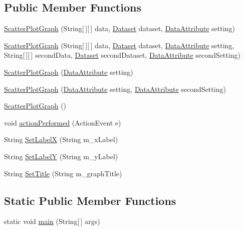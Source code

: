 \subsection*{Public Member Functions}
\begin{DoxyCompactItemize}
\item 
\hyperlink{class_scatter_plot_graph_ac2fd61853bd154841052c26cb3ffb4be}{Scatter\-Plot\-Graph} (String\mbox{[}$\,$\mbox{]}\mbox{[}$\,$\mbox{]} data, \hyperlink{class_dataset}{Dataset} dataset, \hyperlink{class_data_attribute}{Data\-Attribute} setting)
\item 
\hyperlink{class_scatter_plot_graph_a7ef427d6eaea9bd50ac1e3b489ab475e}{Scatter\-Plot\-Graph} (String\mbox{[}$\,$\mbox{]}\mbox{[}$\,$\mbox{]} data, \hyperlink{class_dataset}{Dataset} dataset, \hyperlink{class_data_attribute}{Data\-Attribute} setting, String\mbox{[}$\,$\mbox{]}\mbox{[}$\,$\mbox{]} second\-Data, \hyperlink{class_dataset}{Dataset} second\-Dataset, \hyperlink{class_data_attribute}{Data\-Attribute} second\-Setting)
\item 
\hyperlink{class_scatter_plot_graph_afb2052a677d1caa6fee0897e57f3f964}{Scatter\-Plot\-Graph} (\hyperlink{class_data_attribute}{Data\-Attribute} setting)
\item 
\hyperlink{class_scatter_plot_graph_a654a461323b804f56e918359fd53895d}{Scatter\-Plot\-Graph} (\hyperlink{class_data_attribute}{Data\-Attribute} setting, \hyperlink{class_data_attribute}{Data\-Attribute} second\-Setting)
\item 
\hyperlink{class_scatter_plot_graph_a41ca56e8fb709cf0339e1b3cb46ace51}{Scatter\-Plot\-Graph} ()
\item 
void \hyperlink{class_scatter_plot_graph_aebbb9e7e1bab5bebfa9dacdb3c1f33cb}{action\-Performed} (Action\-Event e)
\item 
String \hyperlink{class_scatter_plot_graph_a5c475561f712ff1f59a394f799d90bc1}{Set\-Label\-X} (String m\-\_\-x\-Label)
\item 
String \hyperlink{class_scatter_plot_graph_a3f1b7d2f08c25432395a50c4c3bd3101}{Set\-Label\-Y} (String m\-\_\-y\-Label)
\item 
String \hyperlink{class_scatter_plot_graph_a4d6cbf2ae379db2d6e0e06a1ffb868ca}{Set\-Title} (String m\-\_\-graph\-Title)
\end{DoxyCompactItemize}
\subsection*{Static Public Member Functions}
\begin{DoxyCompactItemize}
\item 
static void \hyperlink{class_scatter_plot_graph_a9579fc0c252b63f71e608c69c4057bd0}{main} (String\mbox{[}$\,$\mbox{]} args)
\end{DoxyCompactItemize}


